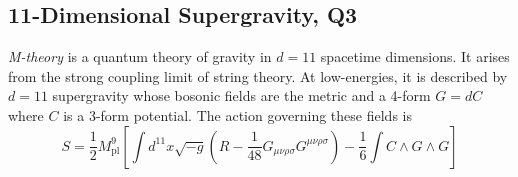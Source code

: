 \subsection{11-Dimensional Supergravity, Q3}

\textit{M-theory} is a quantum theory of gravity in $d=11$ spacetime dimensions. 
It arises from the strong coupling limit of string theory. At low-energies, it is 
described by $d=11$ supergravity whose bosonic fields are the metric and a 4-form 
$G = dC$ where $C$ is a 3-form potential. The action governing these fields is
\begin{equation}
    S = \frac{1}{2}M_{\mathrm{pl}}^9\left[\int d^{11}x\sqrt{-g}
    \left(R - \frac{1}{48}G_{\mu\nu\rho\sigma}G^{\mu\nu\rho\sigma}\right)
    - \frac{1}{6}\int C\wedge G\wedge G\right]
\end{equation}

